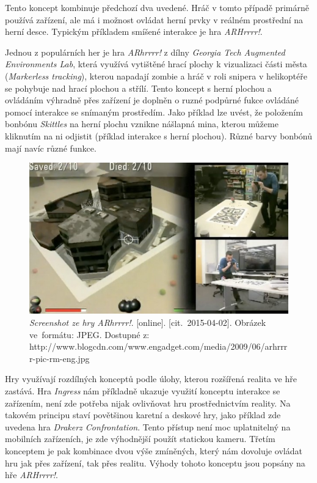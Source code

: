 \documentclass[twoside,12pt]{article}
\begin{document}
Tento koncept kombinuje předchozí dva uvedené. Hráč v tomto případě primárně používá zařízení, ale má i možnost ovládat herní prvky v reálném prostřední na herní desce. Typickým příkladem smíšené interakce je hra \textit{ARHrrrr!}.

% 
Jednou z populárních her je hra \textit{ARhrrrr!} z dílny \textit{Georgia Tech Augmented Environments Lab}, která využívá vytištěné hrací plochy k vizualizaci části města (\textit{Markerless tracking}), kterou napadají zombie a hráč v roli snipera v helikoptéře se pohybuje nad hrací plochou a střílí. Tento koncept s herní plochou a ovládáním výhradně přes zařízení je doplněn o ruzné podpůrné fukce ovládáné pomocí interakce se snímaným prostředím. Jako příklad lze uvést, že položením bonbónu \textit{Skittles} na herní plochu vznikne nášlapná mina, kterou můžeme kliknutím na ni odjistit (příklad interakce s herní plochou). Různé barvy bonbónů mají navíc různé funkce.

\begin{figure}[H]
    \includegraphics[width=424px, center]{images/arhrrrr.jpg}
    \caption{\textit{Screenshot ze hry ARhrrrr!}.
	[online]. [cit.~2015-04-02]. Obrázek ve~formátu: JPEG. Dostupné z: http://www.blogcdn.com/www.engadget.com/media/2009/06/arhrrrr-pic-rm-eng.jpg
}
    \label{arhrrrr_screenshot}
\end{figure}

Hry využívají rozdílných konceptů podle úlohy, kterou rozšířená realita ve hře zastává. Hra \textit{Ingress} nám příkladně ukazuje využití konceptu interakce se zařízením, není zde potřeba nijak ovlivňovat hru prostřednictvím reality. Na takovém principu staví povětšinou karetní a deskové hry, jako příklad zde uvedena hra \textit{Drakerz Confrontation}. Tento přístup není moc uplatnitelný na mobilních zařízeních, je zde výhodnější použít statickou kameru. Třetím konceptem je pak kombinace dvou výše zmíněných, který nám dovoluje ovládat hru jak přes zařízení, tak přes realitu. Výhody tohoto konceptu jsou popsány na hře \textit{ARHrrrr!}.
\end{document}
